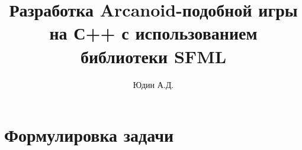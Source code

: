 \documentclass[]{article}
\title{Разработка Arcanoid-подобной игры на С++ с использованием библиотеки SFML}
\author{Юдин А.Д.}
\begin{document}
\maketitle

\section{Формулировка задачи}
\end{document}
